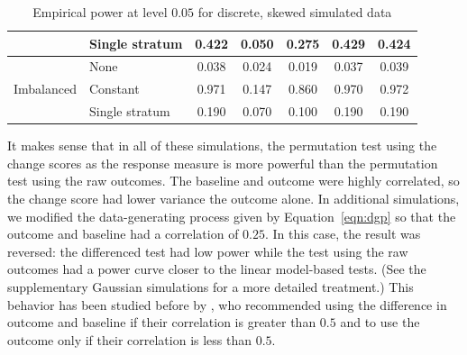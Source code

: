 \documentclass[12pt]{article}
\newcommand{\todo}[1]{{\color{red}{TO DO: \sc #1}}}
\begin{document}
\begin{table}[]
\begin{tabular}{ll|ccccc}
                            & Single stratum                                              & 0.422                      & 0.050                                                                                & 0.275                                                                                 & 0.429                                                                        & 0.424                                                                        \\ \hline
\multirow{3}{*}{Imbalanced} & None                                                        & 0.038                      & 0.024                                                                                & 0.019                                                                                 & 0.037                                                                        & 0.039                                                                        \\
                            & Constant                                                    & 0.971                      & 0.147                                                                                & 0.860                                                                                 & 0.970                                                                        & 0.972                                                                        \\
                            & Single stratum                                              & 0.190                      & 0.070                                                                                & 0.100                                                                                 & 0.190                                                                        & 0.190                                                                        \\ \hline
\end{tabular}
\caption{Empirical power at level $0.05$ for discrete, skewed simulated data} 
\end{table}
It makes sense that in all of these simulations, the permutation test using the change scores as the response measure is more powerful than the permutation test using the raw outcomes.
The baseline and outcome were highly correlated, so the change score had lower variance the outcome alone. \todo{introduce the term change score earlier}
In additional simulations, 
we modified the data-generating process given by Equation~\ref{eqn:dgp} so that the outcome and baseline had a correlation of $0.25$.
In this case, the result was reversed: 
the differenced test had low power while the test using the raw outcomes had a power curve closer to the linear model-based tests.
(See the supplementary Gaussian simulations for a more detailed treatment.)
This behavior has been studied before by \cite{frison_repeated_1992}, who recommended using the difference in outcome and baseline if their correlation is greater than $0.5$ and to use the outcome only if their correlation is less than $0.5$.
\end{document}
